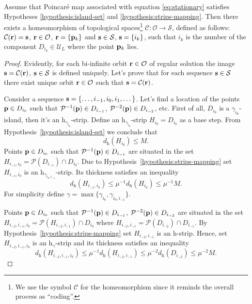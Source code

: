 \begin{theorem}
	Assume that Poincar\'e map associated with equation \eqref{eq:stationary} satisfies Hypotheses \ref{hypothesis:island-set} and \ref{hypothesis:strips-mapping}.
	Then there exists a homeomorphism of topological spaces\footnote{We use the symbol $\mathcal{C}$ for the homeomorphism since it reminds the overall process as ``coding''.} $\mathcal{C}: \mathcal{O} \to \mathcal{S}$, defined as follows: $\mathcal{C}(\vb{r}) = \vb{s}$, $\vb{r} \in \mathcal{O}$, $\vb{r} = \{ \vb{p}_k \}$ and $\vb{s} \in \mathcal{S}$, $\vb{s} = \{ i_k \}$, such that $i_k$ is the number of the component $D_{i_k} \in \mathscr{U}_L$ where the point $\vb{p}_k$ lies.
\label{thm:coding}
\end{theorem}
\begin{proof}
	Evidently, for each bi-infinite orbit $\vb{r} \in \mathcal{O}$ of regular solution the image $\vb{s} = \mathcal{C}(\vb{r})$, $\vb{s} \in \mathcal{S}$ is defined uniquely.
	Let's prove that for each sequence $\vb{s} \in \mathcal{S}$ there exist unique orbit $\vb{r} \in \mathcal{O}$ such that $\vb{s} = \mathcal{C}(\vb{r})$.
	
	Consider a sequence $\vb{s} = \{ \dots, i_{-1}, i_0, i_1, \dots \}$.
	Let's find a location of the points $\vb{p} \in D_{i_0}$ such that $\mathcal{P}^{-1}(\vb{p}) \in D_{i_{-1}}$, $\mathcal{P}^{-2}(\vb{p}) \in D_{i_{-2}}$, etc.
	First of all, $D_{i_0}$ is a $\gamma_{i_0}$-island, then it's an $\mathrm{h}_{\gamma_{i_0}}$-strip.
	Define an $\mathrm{h}_{\gamma_{i_0}}$-strip $H_{i_0} = D_{i_0}$ as a base step.
	From Hypothesis~\ref{hypothesis:island-set} we conclude that
		\begin{equation}
		d_{\mathrm{h}}(H_{i_0}) \le M.
	\end{equation}
	Points $\vb{p} \in D_{i_0}$ such that $\mathcal{P}^{-1}(\vb{p}) \in D_{i_{-1}}$ are situated in the set $H_{i_{-1}, i_0} = \mathcal{P}(D_{i_{-1}}) \cap D_{i_0}$.
	Due to Hypothesis~\ref{hypothesis:strips-mapping} set $H_{i_{-1}, i_0}$ is an $\mathrm{h}_{\gamma_{i_0, i_{-1}}}$-strip.
	Its thickness satisfies an inequality
	\begin{equation}
		d_{\mathrm{h}}(H_{i_{-1}, i_0}) \le \mu^{-1} d_{\mathrm{h}}(H_{i_0}) \le \mu^{-1} M.
	\end{equation}
	For simplicity define $\gamma = \max \{ \gamma_{i_0}, \gamma_{i_0, i_{-1}} \}$.
	
	Points $\vb{p} \in D_{i_0}$ such that $\mathcal{P}^{-1}(\vb{p}) \in D_{i_{-1}}$, $\mathcal{P}^{-2}(\vb{p}) \in D_{i_{-2}}$ are situated in the set $H_{i_{-2}, i_{-1}, i_0} = \mathcal{P}(H_{i_{-2}, i_{-1}}) \cap D_{i_0}$ where $H_{i_{-2}, i_{-1}} = \mathcal{P}(D_{i_{-2}}) \cap D_{i_{-1}}$.
	By Hypothesis~\ref{hypothesis:strips-mapping} set $H_{i_{-2}, i_{-1}}$ is an h-strip.
	Hence, set $H_{i_{-2}, i_{-1}, i_0}$ is an $\mathrm{h}_{\gamma}$-strip and its thickness satisfies an inequality
	\begin{equation}
		d_{\mathrm{h}}(H_{i_{-2}, i_{-1}, i_0}) \le \mu^{-1} d_{\mathrm{h}}(H_{i_{-2}, i_{-1}}) \le \mu^{-2} d_{\mathrm{h}}(D_{i_{-2}}) \le \mu^{-2} M.
	\end{equation}
	

\end{proof}
